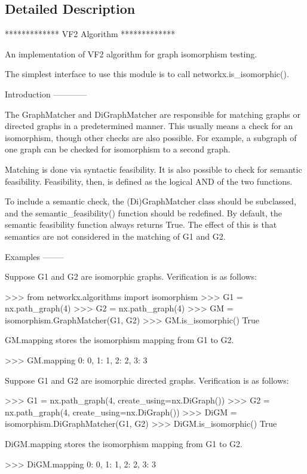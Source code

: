 \subsection{Detailed Description}
\begin{DoxyVerb}*************
VF2 Algorithm
*************

An implementation of VF2 algorithm for graph isomorphism testing.

The simplest interface to use this module is to call networkx.is_isomorphic().

Introduction
------------

The GraphMatcher and DiGraphMatcher are responsible for matching
graphs or directed graphs in a predetermined manner.  This
usually means a check for an isomorphism, though other checks
are also possible.  For example, a subgraph of one graph
can be checked for isomorphism to a second graph.

Matching is done via syntactic feasibility. It is also possible
to check for semantic feasibility. Feasibility, then, is defined
as the logical AND of the two functions.

To include a semantic check, the (Di)GraphMatcher class should be
subclassed, and the semantic_feasibility() function should be
redefined.  By default, the semantic feasibility function always
returns True.  The effect of this is that semantics are not
considered in the matching of G1 and G2.

Examples
--------

Suppose G1 and G2 are isomorphic graphs. Verification is as follows:

>>> from networkx.algorithms import isomorphism
>>> G1 = nx.path_graph(4)
>>> G2 = nx.path_graph(4)
>>> GM = isomorphism.GraphMatcher(G1, G2)
>>> GM.is_isomorphic()
True

GM.mapping stores the isomorphism mapping from G1 to G2.

>>> GM.mapping
{0: 0, 1: 1, 2: 2, 3: 3}


Suppose G1 and G2 are isomorphic directed graphs.
Verification is as follows:

>>> G1 = nx.path_graph(4, create_using=nx.DiGraph())
>>> G2 = nx.path_graph(4, create_using=nx.DiGraph())
>>> DiGM = isomorphism.DiGraphMatcher(G1, G2)
>>> DiGM.is_isomorphic()
True

DiGM.mapping stores the isomorphism mapping from G1 to G2.

>>> DiGM.mapping
{0: 0, 1: 1, 2: 2, 3: 3}




\end{DoxyVerb}
